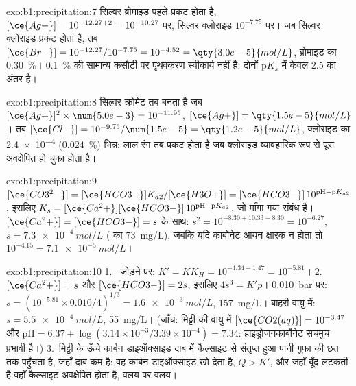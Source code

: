 \begin{solution}{exo:b1:precipitation:7}
सिल्वर ब्रोमाइड पहले प्रकट होता है, $[\ce{Ag+}] = 10^{-12.27 + 2} =
10^{-10.27}$ पर, सिल्वर क्लोराइड $10^{-7.75}$ पर। जब सिल्वर क्लोराइड
प्रकट होता है, तब $[\ce{Br-}] = 10^{-12.27}/10^{-7.75} = 10^{-4.52} =
\qty{3.0e-5}{mol/L}$, ब्रोमाइड का \qty{0.30}{\percent}। \qty{0.1}{\percent} की सामान्य
कसौटी पर पृथक्करण स्वीकार्य नहीं है: दोनों
$\mathrm{p}K_s$ में केवल 2.5 का अंतर है।
\end{solution}

\begin{solution}{exo:b1:precipitation:8}
सिल्वर क्रोमेट तब बनता है जब $[\ce{Ag+}]^2 \times \num{5.0e-3} = 10^{-11.95}$,
$[\ce{Ag+}] = \qty{1.5e-5}{mol/L}$। तब $[\ce{Cl-}] = 10^{-9.75}/\num{1.5e-5}
= \qty{1.2e-5}{mol/L}$, क्लोराइड का \num{2.4e-4} (\qty{0.024}{\percent}) भिन्न:
लाल रंग तब प्रकट होता है जब क्लोराइड व्यावहारिक रूप से पूरा
अवक्षेपित हो चुका होता है।
\end{solution}

\begin{solution}{exo:b1:precipitation:9}
$[\ce{CO3^2-}] = [\ce{HCO3-}]K_{a2}/[\ce{H3O+}] = [\ce{HCO3-}]\,10^{\mathrm{pH}
- \mathrm{p}K_{a2}}$, इसलिए $K_s = [\ce{Ca^2+}][\ce{HCO3-}]\,10^{\mathrm{pH} -
\mathrm{p}K_{a2}}$, जो माँगा गया संबंध है। $[\ce{Ca^2+}] =
[\ce{HCO3-}] = s$ के साथ: $s^2 = 10^{-8.30 + 10.33 - 8.30} = 10^{-6.27}$,
$s = \qty{7.3e-4}{mol/L}$ ( का \qty{73}{mg/L}), जबकि
यदि कार्बोनेट आयन क्षारक न होता तो $10^{-4.15} = \qty{7.1e-5}{mol/L}$।
\end{solution}

\begin{solution}{exo:b1:precipitation:10}
1.~ जोड़ने पर: $K' = K K_H = 10^{-4.34 - 1.47} =
10^{-5.81}$।
2.~$[\ce{Ca^2+}] = s$ और $[\ce{HCO3-}] = 2s$, इसलिए $4s^3 = K'p$।
\qty{0.010}{bar} पर: $s = (10^{-5.81} \times 0.010/4)^{1/3} =
\qty{1.6e-3}{mol/L}$, \qty{157}{mg/L}। बाहरी वायु में:
$s = \qty{5.5e-4}{mol/L}$, \qty{55}{mg/L}। (जाँच: मिट्टी की वायु में
$[\ce{CO2(aq)}] = 10^{-3.47}$ और $\mathrm{pH} = 6.37 + \log(3.14\times
10^{-3}/3.39 \times 10^{-4}) = 7.34$: हाइड्रोजनकार्बोनेट सचमुच प्रभावी है।)
3.~मिट्टी के ऊँचे कार्बन डाइऑक्साइड दाब में कैल्साइट से संतृप्त हुआ पानी
गुफा की छत तक पहुँचता है, जहाँ दाब कम है: वह
कार्बन डाइऑक्साइड खो देता है, $Q > K'$, और जहाँ बूँद लटकती है वहाँ कैल्साइट
अवक्षेपित होता है, वलय पर वलय।
\end{solution}


